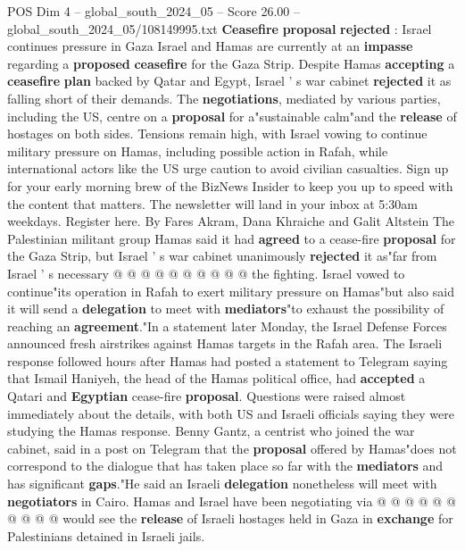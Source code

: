 \begin{textsample}{POS Dim 4 – global\_south\_2024\_05 – Score 26.00 – global\_south\_2024\_05/108149995.txt}  \label{ex:f4_pos_183}
\textbf{Ceasefire} \textbf{proposal} \textbf{rejected} : Israel continues pressure in Gaza Israel and Hamas are currently at an \textbf{impasse} regarding a \textbf{proposed} \textbf{ceasefire} for the Gaza Strip.
Despite Hamas \textbf{accepting} a \textbf{ceasefire} \textbf{plan} backed by Qatar and Egypt, Israel ' s war cabinet \textbf{rejected} it as falling short of their demands.
The \textbf{negotiations}, mediated by various parties, including the US, centre on a \textbf{proposal} for a"sustainable calm"and the \textbf{release} of hostages on both sides.
Tensions remain high, with Israel vowing to continue military pressure on Hamas, including possible action in Rafah, while international actors like the US urge caution to avoid civilian casualties.
Sign up for your early morning brew of the BizNews Insider to keep you up to speed with the content that matters.
The newsletter will land in your inbox at 5:30am weekdays.
Register here.
By Fares Akram, Dana Khraiche and Galit Altstein The Palestinian militant group Hamas said it had \textbf{agreed} to a cease-fire \textbf{proposal} for the Gaza Strip, but Israel ' s war cabinet unanimously \textbf{rejected} it as"far from Israel ' s necessary @ @ @ @ @ @ @ @ @ @ the fighting.
Israel vowed to continue"its operation in Rafah to exert military pressure on Hamas"but also said it will send a \textbf{delegation} to meet with \textbf{mediators}"to exhaust the possibility of reaching an \textbf{agreement}."In a statement later Monday, the Israel Defense Forces announced fresh airstrikes against Hamas targets in the Rafah area.
The Israeli response followed hours after Hamas had posted a statement to Telegram saying that Ismail Haniyeh, the head of the Hamas political office, had \textbf{accepted} a Qatari and \textbf{Egyptian} cease-fire \textbf{proposal}.
Questions were raised almost immediately about the details, with both US and Israeli officials saying they were studying the Hamas response.
Benny Gantz, a centrist who joined the war cabinet, said in a post on Telegram that the \textbf{proposal} offered by Hamas"does not correspond to the dialogue that has taken place so far with the \textbf{mediators} and has significant \textbf{gaps}."He said an Israeli \textbf{delegation} nonetheless will meet with \textbf{negotiators} in Cairo.
Hamas and Israel have been negotiating via @ @ @ @ @ @ @ @ @ @ would see the \textbf{release} of Israeli hostages held in Gaza in \textbf{exchange} for Palestinians detained in Israeli jails.

\end{textsample}

